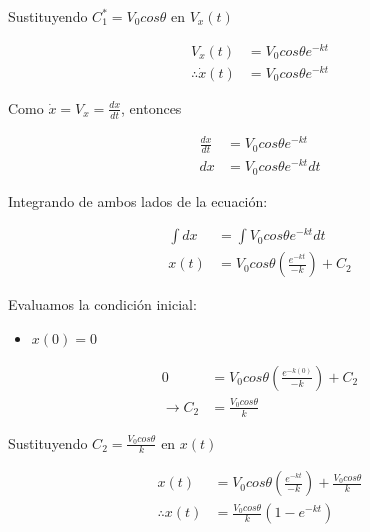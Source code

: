 Sustituyendo $C_{1}^{*} = V_{0}cos \theta$ en $V_{x} (t)$

\begin{align*}
    V_{x} (t) &= V_{0}cos \theta e^{-kt} \\
    \therefore  \dot{x} (t) &= V_{0}cos \theta e^{-kt}
\end{align*}

Como $\dot{x}=V_{x}=\frac{dx}{dt}$, entonces

\begin{align*}
    \frac{dx}{dt} &= V_{0}cos \theta e^{-kt} \\
    dx &= V_{0}cos \theta e^{-kt} dt 
\end{align*}

Integrando de ambos lados de la ecuación:

\begin{align*}
    \int dx &= \int V_{0}cos \theta e^{-kt} dt \\
    x(t) &= V_{0} cos \theta \left( \frac{e^{-kt}}{-k} \right) + C_{2}
\end{align*}

Evaluamos la condición inicial:

\begin{itemize}
    \item $x (0) = 0 $
\end{itemize}

\begin{align*}
    0 &= V_{0} cos \theta \left( \frac{e^{-k(0)}}{-k} \right) + C_{2} \\
    \rightarrow C_{2} &= \frac{V_{0} cos \theta}{k}
\end{align*}

Sustituyendo $ C_{2} = \frac{V_{0} cos \theta}{k} $ en $x(t)$

\begin{align*}
    x(t) &= V_{0} cos \theta \left( \frac{e^{-kt}}{-k} \right) + \frac{V_{0} cos \theta}{k} \\
    \therefore x(t) &= \frac{V_{0} cos \theta}{k} \left( 1-e^{-kt} \right)
\end{align*}